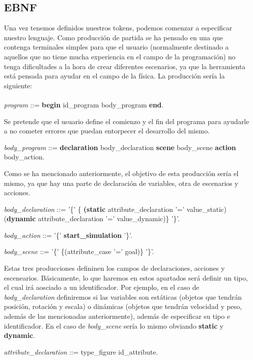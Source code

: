 \documentclass[12pt]{article}
\begin{document}
\subsection{EBNF}

Una vez tenemos definidos nuestros tokens, podemos comenzar a especificar nuestro lenguaje. Como producción de partida se ha pensado en una que contenga terminales simples para que el usuario (normalmente destinado a aquellos que no tiene mucha experiencia en el campo de la programación) no tenga dificultades a la hora de crear diferentes escenarios, ya que la herramienta está pensada para ayudar en el campo de la física. La producción sería la siguiente: \\ \\
\noindent \textit{program} ::= \textbf{begin} id\_program body\_program \textbf{end}.

Se pretende que el usuario define el comienzo y el fin del programa para ayudarle a no cometer errores que puedan entorpecer el desarrollo del mismo.

\noindent \textit{body\_program} ::= \textbf{declaration} body\_declaration \textbf{scene} body\_scene \textbf{action} body\_action.

Como se ha mencionado anteriormente, el objetivo de esta producción sería el mismo, ya que hay una parte de declaración de variables, otra de escenarios y acciones.

\noindent\textit{body\_declaration} ::= '\{' \{ \textbf{(static} attribute\_declaration '=' value\_static) \textbar (\textbf{dynamic} attribute\_declaration '=' value\_dynamic)\}  '\}'.

\noindent \textit{body\_action} ::= '\{' \textbf{start\_simulation} '\}'.

\noindent \textit{body\_scene} ::= '\{' \{(attribute\_case '=' goal)\} '\}'.

Estas tres producciones defininen los campos de declaraciones, acciones y escenearios. Básicamente, lo que haremos en estos apartados será definir un tipo, el cual irá aosciado a un identificador. Por ejemplo, en el caso de \textit{body\_declaration} definiremos si las variables son estáticas (objetos que tendrán posición, rotación y escala) o dinámicas (objetos que tendrán velocidad y peso, además de las mencionadas anteriormente), además de especificar su tipo e identificador. En el caso de \textit{body\_scene} sería lo mismo obviando \textbf{static} y \textbf{dynamic}.

\noindent \textit{attribute\_declaration} ::= type\_figure id\_attribute.
\end{document}
